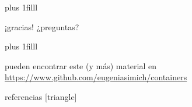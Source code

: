 \documentclass[9pt]{beamer}
\newcommand{\llenar}{\vskip0pt plus 1filll}
\begin{document}
\appendix

\begin{frame}[standout]
  \llenar
  
  ¡gracias!
  ¿preguntas?

  \llenar

  pueden encontrar este (y más) material en \url{https://www.github.com/eugeniasimich/containers}

\end{frame}

\begin{frame}{referencias}
  [triangle]
  \nocite{*}
  
  

\end{frame}

\end{document}
